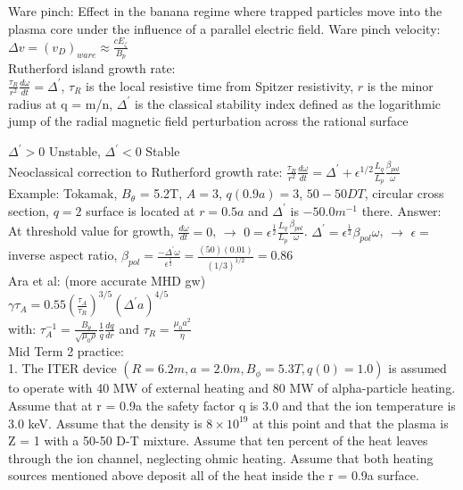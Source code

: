 \documentclass[10pt]{extarticle}
\begin{document}
\begin{multicols}{3}
Ware pinch: Effect in the banana regime where trapped particles move into the plasma core under the influence of a parallel electric field. Ware pinch velocity: $\Delta v = (v_{D})_{ware} \approx \frac{cE_{\zeta}}{B_{p}}$\\ 

Rutherford island growth rate:\\
$\frac{\tau_{R}}{r^{2}} \frac{d\omega}{dt} = \Delta ^{\prime}$,
$\tau_{R}$ is the local resistive time from Spitzer resistivity,
$r$ is the minor radius at q = m/n,
$\Delta ^{\prime}$ is the classical stability index defined as the logarithmic jump of the radial magnetic field perturbation across the rational surface

$\Delta ^{\prime} > 0$ Unstable,
$\Delta ^{\prime} < 0$ Stable \\

Neoclassical correction to Rutherford growth rate:
$\frac{\tau_{R}}{r^{2}} \frac{d\omega}{dt} = \Delta ^{\prime} + \epsilon^{1/2}\frac{L_{q}}{L_{p}}\frac{\beta_{pol}}{\omega}$\\

Example: Tokamak, $B_{\theta}$ = 5.2T, $A = 3$, $q(0.9a) = 3$, $50-50DT$, circular cross section, $q=2$ surface is located at $r = 0.5a$ and $\Delta^{\prime}$ is $-50.0 m^{-1}$ there.  Answer:  At threshold value for growth, $\frac{d\omega}{dt} = 0$, $\rightarrow$  $0 = \epsilon^{\frac{1}{2}} \frac{L_{q}}{L_{p}}\frac{\beta_{pol}}{\omega}$.  $\Delta^{\prime} = \epsilon^{\frac{1}{2}} \beta_{pol} \omega$, $\rightarrow$ $\epsilon =$ inverse aspect ratio, $\beta_{pol} = \frac{-\Delta^{\prime}\omega}{\epsilon^{\frac{1}{2}}} = \frac{(50)(0.01)}{(1/3)^{1/2}} = 0.86$\\

Ara et al: (more accurate MHD gw)\\
$\gamma \tau_{A} = 0.55 (\frac{\tau_{A}}{\tau_{R}})^{3/5}(\Delta^{\prime}a)^{4/5}$\\
with: $\tau_{A} ^{-1}= \frac{B_{\theta}}{\sqrt{\mu_{0}\rho}}\frac{1}{q}\frac{dq}{dr}$
 and $\tau_{R} = \frac{\mu_{0}a^{2}}{\eta}$\\
 
 Mid Term 2 practice:\\
 1.  The ITER device $(R=6.2m,a=2.0m,B_{\phi} = 5.3T,q(0)=1.0)$ is assumed to operate with 40 MW of external heating and 80 MW of alpha-particle heating. Assume that at r = 0.9a the safety factor q is 3.0 and that the ion temperature is 3.0 keV.  Assume that the density is $8\times 10^{19}$ at this point and that the plasma is Z = 1 with a 50-50 D-T mixture.  Assume that ten percent of the heat leaves through the ion channel, neglecting ohmic heating.  Assume that both heating sources mentioned above deposit all of the heat inside the r = 0.9a surface. 
 

\end{multicols}
\end{document}
